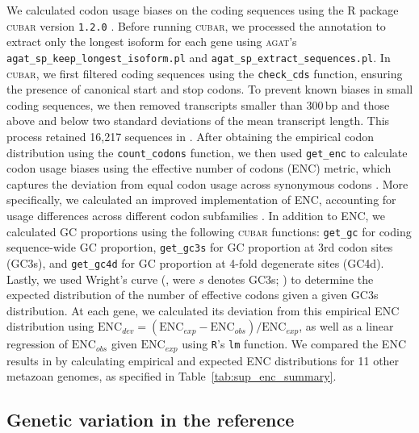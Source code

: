We calculated codon usage biases on the \bgla{} coding sequences using the R package
\textsc{cubar} version \texttt{1.2.0} \citep{liu_cubar_2026}.
Before running \textsc{cubar}, we processed the annotation to extract only the longest
isoform for each gene using \textsc{agat}'s \texttt{agat\_sp\_keep\_longest\_isoform.pl}
and \texttt{agat\_sp\_extract\_sequences.pl}.
In \textsc{cubar}, we first filtered coding sequences using the \texttt{check\_cds}
function, ensuring the presence of canonical start and stop codons.
To prevent known biases in small coding sequences, we then removed transcripts smaller
than 300\,bp and those above and below two standard deviations of the mean transcript
length.
This process retained 16{,}217 sequences in \bgla{}.
After obtaining the empirical codon distribution using the \texttt{count\_codons} function,
we then used \texttt{get\_enc} to calculate codon usage biases using the effective number
of codons (ENC) metric, which captures the deviation from equal codon usage across
synonymous codons \citep{wright_effective_1990}.
More specifically, we calculated an improved implementation of ENC, accounting for
usage differences across different codon subfamilies \citep{sun_improved_2013}.
In addition to ENC, we calculated GC proportions using the following \textsc{cubar}
functions: \texttt{get\_gc} for coding sequence-wide GC proportion, \texttt{get\_gc3s}
for GC proportion at 3rd codon sites (GC3s), and \texttt{get\_gc4d} for GC proportion
at 4-fold degenerate sites (GC4d).
Lastly, we used Wright's curve (\wrightenc, were $s$ denotes GC3s;
\citealp{wright_effective_1990}) to determine the expected distribution of the number of
effective codons given a given GC3s distribution.
At each gene, we calculated its deviation from this empirical ENC distribution using
$\text{ENC}_{dev} = (\text{ENC}_{exp} - \text{ENC}_{obs}) / \text{ENC}_{exp}$,
as well as a linear regression of $\text{ENC}_{obs}$ given $\text{ENC}_{exp}$ using
\texttt{R}'s \texttt{lm} function.
We compared the ENC results in \bgla{} by calculating empirical and expected ENC
distributions for 11 other metazoan genomes, as specified in Table~\ref{tab:sup_enc_summary}.

\subsection*{Genetic variation in the \balgla{} reference}\label{sec:methods_ref_geno}

